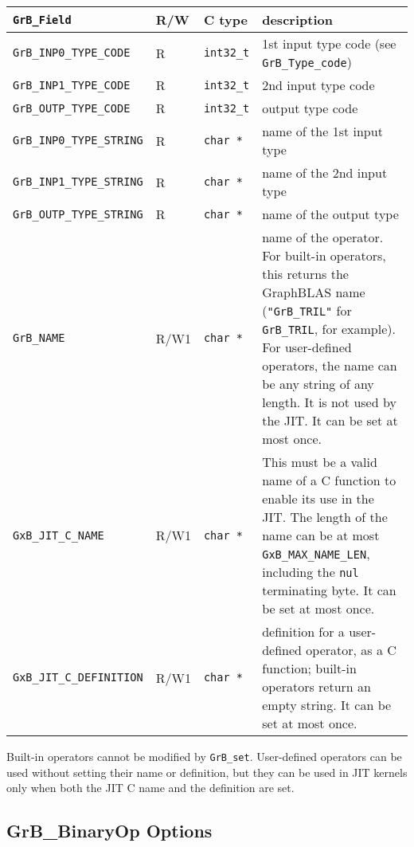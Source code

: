 \noindent
{\small
\begin{tabular}{|l|l|l|p{2.8in}|}
\hline
\verb'GrB_Field'                    & R/W  & C type        & description \\
\hline
\verb'GrB_INP0_TYPE_CODE'          & R    & \verb'int32_t'& 1st input type code (see \verb'GrB_Type_code') \\
\verb'GrB_INP1_TYPE_CODE'          & R    & \verb'int32_t'& 2nd input type code \\
\verb'GrB_OUTP_TYPE_CODE'          & R    & \verb'int32_t'& output type code \\
\verb'GrB_INP0_TYPE_STRING'        & R    & \verb'char *' & name of the 1st input type \\
\verb'GrB_INP1_TYPE_STRING'        & R    & \verb'char *' & name of the 2nd input type \\
\verb'GrB_OUTP_TYPE_STRING'        & R    & \verb'char *' & name of the output type \\
\hline
\verb'GrB_NAME'                     & R/W1 & \verb'char *' &    %
    name of the operator.  For built-in operators, this returns the GraphBLAS
    name (\verb'"GrB_TRIL"' for \verb'GrB_TRIL', for example).
    For user-defined operators, the name can be any string of any length.  It
    is not used by the JIT.  It can be set at most once. \\
\verb'GxB_JIT_C_NAME'               & R/W1 & \verb'char *' &
    This must be a valid name of a C function to enable its use in the JIT.
    The length of the name can be at most \verb'GxB_MAX_NAME_LEN', including
    the \verb'nul' terminating byte.  It can be set at most once. \\
\verb'GxB_JIT_C_DEFINITION'         & R/W1 & \verb'char *' &
    definition for a user-defined operator, as a C function; built-in operators
    return an empty string.  It can be set at most once. \\
\hline
\end{tabular}
}

Built-in operators cannot be modified by \verb'GrB_set'.  User-defined
operators can be used without setting their name or definition, but they can be
used in JIT kernels only when both the JIT C name and the definition are set.

\newpage
\subsection{{\sf GrB\_BinaryOp} Options}
\label{get_set_binop}

